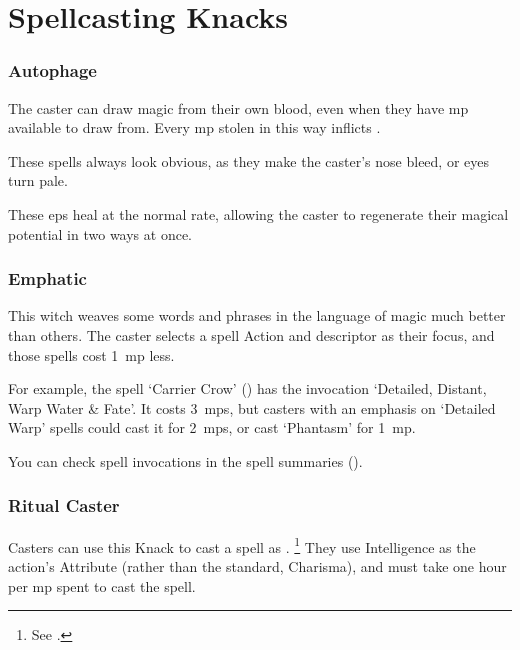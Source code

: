 \section{Spellcasting Knacks}

\begin{multicols}{2}


\subsubsection{Autophage}

The caster can draw magic from their own blood, even when they have \gls{mp} available to draw from.
Every \gls{mp} stolen in this way inflicts .

These spells always look obvious, as they make the caster's nose bleed, or eyes turn pale.

These \glspl{ep} heal at the normal rate, allowing the caster to regenerate their magical potential in two ways at once.

\subsubsection{Emphatic}
\label{emphaticCaster}

This \gls{witch} weaves some words and phrases in the language of magic much better than others.
The caster selects a spell Action and \gls{descriptor} as their focus, and those spells cost 1~\gls{mp} less.

For example, the spell `Carrier Crow' () has the invocation `Detailed, Distant, Warp Water \& Fate'.
It costs 3~\glspl{mp}, but casters with an emphasis on `Detailed Warp' spells could cast it for 2~\glspl{mp}, or cast `Phantasm' for 1~\gls{mp}.

You can check spell \glspl{invocation} in the spell summaries ().

\subsubsection{Ritual Caster}
\label{ritualCaster}

Casters can use this Knack to cast a spell as .%
\footnote{See .}
They use Intelligence as the action's Attribute (rather than the standard, Charisma), and must take one hour per \gls{mp} spent to cast the spell.


\end{multicols}
